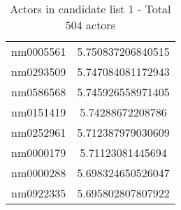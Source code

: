 \begin{table}[H]
\begin{tabular}{ |c|c| }
            nm0005561 & 5.750837206840515 \\
            nm0293509 & 5.747084081172943 \\
            nm0586568 & 5.745926558971405 \\
            nm0151419 & 5.74288672208786 \\
            nm0252961 & 5.712387979030609 \\
            nm0000179 & 5.71123081445694 \\
            nm0000288 & 5.698324650526047 \\
            nm0922335 & 5.695802807807922 \\
            \hline
        \end{tabular}
    \caption{Actors in candidate list 1 - Total 504 actors}
\end{table}

